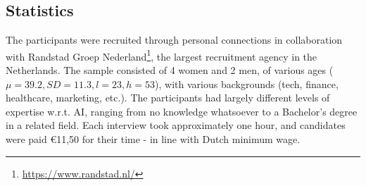 \subsection{Statistics}
The participants were recruited through personal connections in collaboration with Randstad Groep Nederland\footnote{\url{https://www.randstad.nl/}}, the largest recruitment agency in the Netherlands. The sample consisted of 4 women and 2 men, of various ages ($\mu = 39.2, SD = 11.3, l=23, h=53$), with various backgrounds (tech, finance, healthcare, marketing, etc.). The participants had largely different levels of expertise w.r.t. AI, ranging from no knowledge whatsoever to a Bachelor's degree in a related field. Each interview took approximately one hour, and candidates were paid \euro{11,50} for their time - in line with Dutch minimum wage. 